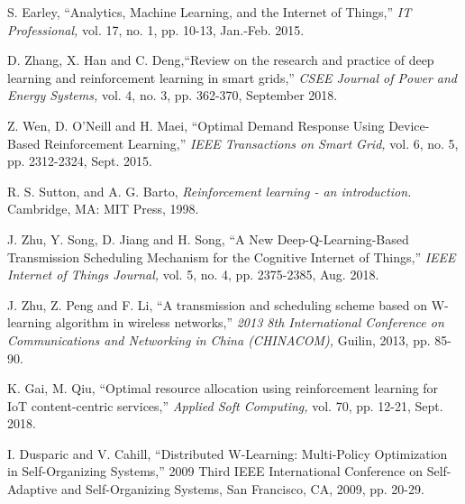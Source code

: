 \documentclass[journal]{IEEEtran}
\begin{document}

%
%
%
\begin{thebibliography}{1}

S. Earley, ``Analytics, Machine Learning, and the Internet of Things,'' \emph{IT Professional,} vol. 17, no. 1, pp. 10-13, Jan.-Feb. 2015.

D. Zhang, X. Han and C. Deng,``Review on the research and practice of deep learning and reinforcement learning in smart grids,'' \emph{CSEE Journal of Power and Energy Systems,} vol. 4, no. 3, pp. 362-370, September 2018.

Z. Wen, D. O'Neill and H. Maei, ``Optimal Demand Response Using Device-Based Reinforcement Learning,'' \emph{IEEE Transactions on Smart Grid,} vol. 6, no. 5, pp. 2312-2324, Sept. 2015.

R. S. Sutton, and A. G. Barto, \emph{Reinforcement learning - an introduction.} Cambridge, MA: MIT Press, 1998.

J. Zhu, Y. Song, D. Jiang and H. Song, ``A New Deep-Q-Learning-Based Transmission Scheduling Mechanism for the Cognitive Internet of Things,'' \emph{IEEE Internet of Things Journal,} vol. 5, no. 4, pp. 2375-2385, Aug. 2018.

J. Zhu, Z. Peng and F. Li, ``A transmission and scheduling scheme based on W-learning algorithm in wireless networks,'' \emph{2013 8th International Conference on Communications and Networking in China (CHINACOM),} Guilin, 2013, pp. 85-90.

K. Gai, M. Qiu, ``Optimal resource allocation using reinforcement learning for IoT content-centric services,'' \emph{Applied Soft Computing,} vol. 70,
pp. 12-21, Sept. 2018.

I. Dusparic and V. Cahill, ``Distributed W-Learning: Multi-Policy Optimization in Self-Organizing Systems,'' 2009 Third IEEE International Conference on Self-Adaptive and Self-Organizing Systems, San Francisco, CA, 2009, pp. 20-29.


\end{thebibliography}
\end{document}
